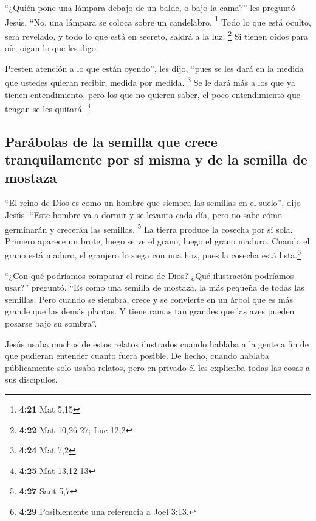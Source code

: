  ``¿Quién pone una lámpara debajo de un balde, o bajo la
cama?'' les preguntó Jesús. ``No, una lámpara se coloca sobre un
candelabro. \footnote{\textbf{4:21} Mat 5,15}  Todo lo
que está oculto, será revelado, y todo lo que está en secreto, saldrá a
la luz. \footnote{\textbf{4:22} Mat 10,26-27; Luc 12,2} 
Si tienen oídos para oír, oigan lo que les digo.

 Presten atención a lo que están oyendo'', les dijo,
``pues se les dará en la medida que ustedes quieran recibir, medida por
medida. \footnote{\textbf{4:24} Mat 7,2}  Se le dará más
a los que ya tienen entendimiento, pero los que no quieren saber, el
poco entendimiento que tengan se les quitará. \footnote{\textbf{4:25}
  Mat 13,12-13}

\hypertarget{paruxe1bolas-de-la-semilla-que-crece-tranquilamente-por-suxed-misma-y-de-la-semilla-de-mostaza}{%
\subsection{Parábolas de la semilla que crece tranquilamente por sí
misma y de la semilla de
mostaza}\label{paruxe1bolas-de-la-semilla-que-crece-tranquilamente-por-suxed-misma-y-de-la-semilla-de-mostaza}}

 ``El reino de Dios es como un hombre que siembra las
semillas en el suelo'', dijo Jesús.  ``Este hombre va a
dormir y se levanta cada día, pero no sabe cómo germinarán y crecerán
las semillas. \footnote{\textbf{4:27} Sant 5,7}  La
tierra produce la cosecha por sí sola. Primero aparece un brote, luego
se ve el grano, luego el grano maduro.  Cuando el grano
está maduro, el granjero lo siega con una hoz, pues la cosecha está
lista.\footnote{\textbf{4:29} Posiblemente una referencia a Joel 3:13.}

 ``¿Con qué podríamos comparar el reino de Dios? ¿Qué
ilustración podríamos usar?'' preguntó.  ``Es como una
semilla de mostaza, la más pequeña de todas las semillas.
 Pero cuando se siembra, crece y se convierte en un árbol
que es más grande que las demás plantas. Y tiene ramas tan grandes que
las aves pueden posarse bajo su sombra''.

 Jesús usaba muchos de estos relatos ilustrados cuando
hablaba a la gente a fin de que pudieran entender cuanto fuera posible.
 De hecho, cuando hablaba públicamente solo usaba
relatos, pero en privado él les explicaba todas las cosas a sus
discípulos.

